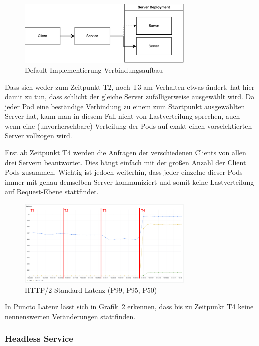 \begin{figure}[H]
    \centering
    \includegraphics[width=0.75\textwidth]{img/default_loadbalancing}
    \caption{Default Implementierung Verbindungsaufbau}
    \label{fig:default_loadbalancing}
\end{figure}


Dass sich weder zum Zeitpunkt T2, noch T3 am Verhalten etwas ändert, hat hier damit zu tun, dass schlicht der gleiche Server zufälligerweise ausgewählt wird.
Da jeder Pod eine beständige Verbindung zu einem zum Startpunkt ausgewählten Server hat, kann man in diesem Fall nicht von Lastverteilung sprechen, auch wenn eine (unvorhersehbare) Verteilung der Pods auf exakt einen vorselektierten Server vollzogen wird.

Erst ab Zeitpunkt T4 werden die Anfragen der verschiedenen Clients von allen drei Servern beantwortet.
Dies hängt einfach mit der großen Anzahl der Client Pods zusammen.
Wichtig ist jedoch weiterhin, dass jeder einzelne dieser Pods immer mit genau demselben Server kommuniziert und somit keine Lastverteilung auf Request-Ebene stattfindet.


\begin{figure}[H]
    \centering
    \includegraphics[width=0.75\textwidth]{img/default_latenz}
    \caption{HTTP/2 Standard Latenz (P99, P95, P50)}
    \label{fig:default_latenz}
\end{figure}

In Puncto Latenz lässt sich in Grafik~\ref{fig:default_latenz} erkennen, dass bis zu Zeitpunkt T4 keine nennenswerten Veränderungen stattfinden.

\subsubsection{Headless Service}\label{subsubsec:headless}

